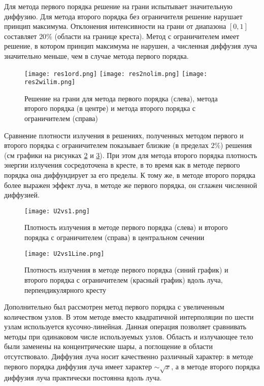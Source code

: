 
Для метода первого порядка решение на грани испытывает значительную диффузию. Для метода второго порядка без ограничителя решение нарушает принцип максимума. Отклонения интенсивности на грани от диапазона $[0, 1]$ составляет $20 \%$ (области на границе креста). Метод с ограничителем имеет решение, в котором принцип максимума не нарушен, а численная диффузия луча значительно меньше, чем в случае метода первого порядка.

\begin{figure}[ht!]
\centering
\texttt{[image: res1ord.png]}
\texttt{[image: res2nolim.png]}
\texttt{[image: res2wilim.png]}
\caption{Решение на грани для метода первого порядка (слева), метода второго порядка (в центре) и метода второго порядка с ограничителем (справа)}
\label{fig:limiter}
\end{figure}

Сравнение плотности излучения в решениях, полученных методом первого и второго порядка с ограничителем показывает близкие (в пределах $2\%$) решения (см графики на рисунках \ref{fig:U2vs1} и \ref{fig:U2vs1Line}). При этом для метода второго порядка плотность энергии излучения сосредоточена в кресте, в то время как в методе первого порядка она диффундирует за его пределы. К тому же, в методе второго порядка более выражен эффект луча, в методе же первого порядка, он сглажен численной диффузией.

\begin{figure}[ht!]
\centering
\texttt{[image: U2vs1.png]}
\caption{Плотность излучения в методе первого порядка (слева) и второго порядка с ограничителем (справа) в центральном сечении}
\label{fig:U2vs1}
\end{figure}

\begin{figure}[ht!]
\centering
\texttt{[image: U2vs1Line.png]}
\caption{Плотность излучения в методе первого порядка (синий график) и второго порядка с ограничителем (красный график) вдоль луча, перпендикулярного кресту}
\label{fig:U2vs1Line}
\end{figure}

Дополнительно был рассмотрен метод первого порядка с увеличенным количеством узлов. В этом методе вместо квадратичной интерполяции по шести узлам используется кусочно-линейная. Данная операция позволяет сравнивать методы при одинаковом числе используемых узлов. Область и излучающее тело были заменены на концентрические шары, а поглощение в области отсутствовало. Диффузия луча носит качественно различный характер: в методе первого порядка диффузия луча имеет характер $\sim \sqrt{x}$, а в методе второго порядка диффузия луча практически постоянна вдоль луча.

